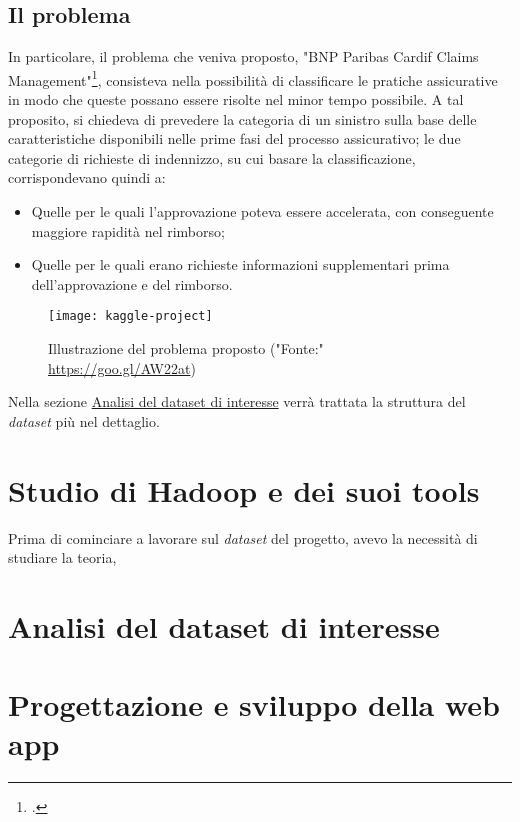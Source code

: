 \subsection{Il problema}
In particolare, il problema che veniva proposto, "BNP Paribas Cardif Claims Management"\footcite{https://www.kaggle.com/c/bnp-paribas-cardif-claims-management}, consisteva nella possibilità di classificare le pratiche assicurative in modo che queste possano essere risolte nel minor tempo possibile. A tal proposito, si chiedeva di prevedere la categoria di un sinistro sulla base delle caratteristiche disponibili nelle prime fasi del processo assicurativo; le due categorie di richieste di indennizzo, su cui basare la classificazione, corrispondevano quindi a:
\begin{itemize}
	\item Quelle per le quali l'approvazione poteva essere accelerata, con conseguente maggiore rapidità nel rimborso;
	\item Quelle per le quali erano richieste informazioni supplementari prima dell'approvazione e del rimborso.
\end{itemize}
\clearpage
\begin{figure}[!h] 
	\centering 
	\texttt{[image: kaggle-project]}
	\caption{Illustrazione del problema proposto ("Fonte:" \href{https://goo.gl/AW22at}{https://goo.gl/AW22at})}
\end{figure}
Nella sezione \hyperref[dataset]{Analisi del dataset di interesse} verrà trattata la struttura del \textit{dataset} più nel dettaglio.

\section{Studio di Hadoop e dei suoi tools}
Prima di cominciare a lavorare sul \textit{dataset} del progetto, avevo la necessità di studiare la teoria,

\section{Analisi del dataset di interesse} \label{dataset}


\section{Progettazione e sviluppo della web app}
